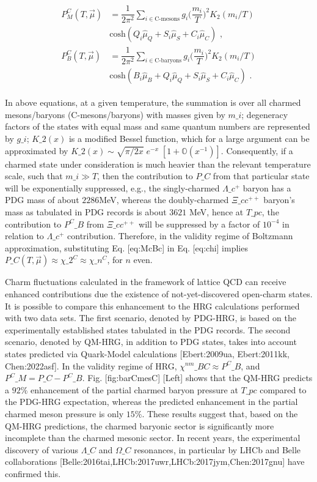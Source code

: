 \documentclass[11pt,a4paper]{article}
\begin{document}
$$\begin{gather}
	\begin{aligned}
		{P^C_{M}(T,\overrightarrow{\mu})}&{=\dfrac{1}{2\pi^2}\sum_{i\in \text{C-mesons}}g_i \bigg(\dfrac{m_i}{T}\bigg)^2K_2(m_i/T)}\\
			&{\text{cosh}(Q_i\hat{\mu}_Q+S_i\hat{\mu}_S+C_i\hat{\mu}_C)} \text{ ,}\\
		{P^C_{B}(T,\overrightarrow{\mu})}&={\dfrac{1}{2\pi^2}\sum_{i\in \text{C-baryons}}g_i \bigg(\dfrac{m_i}{T}\bigg)^2K_2(m_i/T)}\\
			&{\text{cosh}(B_i\hat{\mu}_B+Q_i\hat{\mu}_Q+S_i\hat{\mu}_S+C_i\hat{\mu}_C)} \text{ .}
		
	\end{aligned}
\end{gather}$$

In above equations, at a given temperature, the summation is over all charmed mesons/baryons (C-mesons/baryons) with masses given by ${m\_i}$; degeneracy factors of the states with equal mass and same quantum numbers are represented by ${g\_i}$; ${K\_2(x)}$ is a modified Bessel function, which for a large argument can be approximated by
${K\_2(x)}\sim\sqrt{\pi/2x}\;e^{-x}\;[1+\mathbb{O}(x^{-1})]$. Consequently, if a charmed state under consideration is much heavier than the relevant temperature scale, such that ${m\_i\gg T}$, then the contribution to ${P\_C}$ from that particular state will be exponentially suppressed, e.g., the singly-charmed
${\Lambda}\_c^{+}$ baryon has a PDG mass of about $2286$MeV, whereas the doubly-charmed ${\Xi\_{cc}^{++}}$ baryon's mass as tabulated in PDG records is about $3621$ MeV, hence at ${T\_{pc}}$, the contribution to ${P^C\_{B}}$ from ${\Xi\_{cc}^{++}}$ will be suppressed by a factor of $10^{-4}$ in relation to ${\Lambda}\_c^{+}$ contribution. Therefore, in the validity regime of Boltzmann approximation, substituting Eq. [eq:McBc] in Eq. [eq:chi] implies $P\_C(T,\vec{\mu})\approx\chi\_2^C\approx\chi\_n^C$, for $n$ even.

Charm fluctuations calculated in the framework of lattice QCD can receive enhanced contributions due the existence of not-yet-discovered open-charm states. It is possible to compare this enhancement to the HRG calculations performed with two data sets. The first scenario, denoted by PDG-HRG, is based on the experimentally established states tabulated in the PDG records. The second scenario, denoted by QM-HRG, in addition to PDG states, takes into account states predicted via Quark-Model calculations [Ebert:2009ua, Ebert:2011kk, Chen:2022asf]. In the validity regime of HRG, $\chi^{nm}\_{BC}\approx P^C\_{B}$, and $P^C\_{M} = P\_C-P^C\_{B}$. Fig. [fig:barCmesC] [Left] shows that the QM-HRG predicts a $92\%$ enhancement of the partial charmed baryon pressure at $T\_{pc}$ compared to the PDG-HRG expectation, whereas the predicted enhancement in the partial charmed meson pressure is only $15\%$. These results suggest that, based on the QM-HRG predictions, the charmed baryonic sector is significantly more incomplete than the charmed mesonic sector. In recent years, the 
 experimental
 discovery of various $\Lambda\_C$ and $\Omega\_C$ resonances, in particular by LHCb and Belle collaborations [Belle:2016tai,LHCb:2017uwr,LHCb:2017jym,Chen:2017gnu] have confirmed this.
\end{document}
